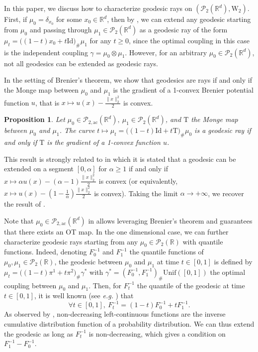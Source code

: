 \documentclass[twoside]{article}
\newtheorem{proposition}{Proposition}
\newcommand{\cP}{\mathcal{P}}
\newcommand{\cPa}{\mathcal{P}_{2,\mathrm{ac}}(\R^d)}
\newcommand{\W}{\mathrm{W}}
\newcommand{\R}{\mathbb{R}}
\newcommand{\T}{\mathrm{T}}
\newcommand{\id}{\mathrm{Id}}
\begin{document}
 In this paper, we discuss how to characterize geodesic rays on $(\cP_2(\R^d),\W_2)$. First, if $\mu_0=\delta_{x_0}$ for some $x_0\in \R^d$, then by \citep[Lemma 2.1]{bertrand2016geometric}, we can extend any geodesic starting from $\mu_0$ and passing through $\mu_1\in\cP_2(\R^d)$ as a geodesic ray of the form $\mu_t = \big((1-t)x_0 + t\id)_\#\mu_1$ for any $t\ge 0$, since the optimal coupling in this case is the independent coupling $\gamma=\mu_0\otimes\mu_1$. However, for an arbitrary $\mu_0\in\cP_2(\R^d)$, not all geodesics can be extended as geodesic rays.

 In the setting of Brenier's theorem, we show that geodesics are rays if and only if the Monge map between $\mu_0$ and $\mu_1$ is the gradient of a 1-convex Brenier potential function $u$, that is $x\mapsto u(x) - \frac{\|x\|_2^2}{2}$ is convex.
\begin{proposition} \label{prop:geodesic_rays}
    Let $\mu_0\in\cPa,\ \mu_1\in\cP_2(\R^d)$, and $\T$ the Monge map between $\mu_0$ and $\mu_1$. The curve $t\mapsto \mu_t = \big((1-t)\id + t \T\big)_\#\mu_0$ is a geodesic ray if and only if $\T$ is the gradient of a 1-convex function $u$.
\end{proposition}

This result is strongly related to \citep[Section 4]{natale2022geodesic} in which it is stated that a geodesic can be extended on a segment $[0,\alpha]$ for $\alpha\ge 1$ if and only if $x\mapsto \alpha u(x) - (\alpha-1)\frac{\|x\|_2^2}{2}$ is convex (or equivalently, $x\mapsto u(x) - (1-\frac{1}{\alpha})\frac{\|x\|_2^2}{2}$ is convex). Taking the limit $\alpha\to+\infty$, we recover the result of .



Note that $\mu_0\in\cPa$ in  allows leveraging Brenier's theorem and guarantees that there exists an OT map. In the one dimensional case, we can further characterize geodesic rays starting from any $\mu_0\in\cP_2(\R)$ with quantile functions. Indeed, denoting $F_0^{-1}$ and $F_1^{-1}$ the quantile functions of $\mu_0, \mu_1\in\mathcal{P}_2(\mathbb{R})$, the geodesic between $\mu_0$ and $\mu_1$ at time $t\in [0,1]$ is defined by $\mu_t = \big((1-t)\pi^1 + t \pi^2 \big)_\#\gamma^*$ with $\gamma^*=(F_0^{-1},F_1^{-1})_\#\mathrm{Unif}([0,1])$ the optimal coupling between $\mu_0$ and $\mu_1$. Then, for $F_t^{-1}$ the quantile of the geodesic at time $t\in [0,1]$, it is well known (see \emph{e.g.} \citep[Equation 7.2.8]{ambrosio2008gradient}) that
\begin{equation} \label{eq:geodesics_1d}
    \forall t\in [0,1],\ F_t^{-1} = (1-t)F_0^{-1} + tF_1^{-1}.
\end{equation}
 As observed by \citet{kloeckner2010geometric}, non-decreasing left-continuous functions are the inverse cumulative distribution function of a probability distribution. We can thus extend the geodesic as long as $F_t^{-1}$ is non-decreasing, which gives a condition on $F_1^{-1}-F_0^{-1}$.
\end{document}
